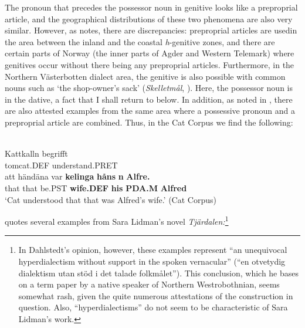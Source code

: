 The pronoun that precedes the possessor noun in genitive looks like a preproprial article, and the geographical distributions of these two phenomena are also very similar. However, as \citet[67]{Delsing2003b} notes, there are discrepancies: preproprial articles are used\textstyleLinguisticExample{ }in the area between the inland and the coastal \textit{h}{}-genitive zones, and there are certain parts of Norway (the inner parts of Agder and Western Telemark) where genitives occur without there being any preproprial articles. Furthermore, in the Northern Västerbotten dialect area, the genitive is also possible with common nouns such as  ‘the shop-owner’s sack’ (\textit{Skelletmål}, \citet[23]{Marklund1976}). Here, the possessor noun is in the dative, a fact that I shall return to below. In addition, as noted in \citet{HolmbergEtAl}, there are also attested examples from the same area where a possessive pronoun and a preproprial article are combined. Thus, in the Cat Corpus we find the following:

\ea\label{}
\\
\gll Kattkalln  begrifft\\
tomcat.DEF  understand.PRET\\
\gll att  händäna  var  \textbf{kelinga} \textbf{håns} \textbf{n} \textbf{Alfre.}\\
that  that  be.PST  \textbf{wife.DEF} \textbf{his} \textbf{PDA.M} \textbf{Alfred}\\
\glt  ‘Cat understood that that was Alfred’s wife.’ (Cat Corpus)
\z

\citet[51]{Dahlstedt1971} quotes several examples from Sara Lidman’s novel \textit{Tjärdalen}\textit{:}\footnote{ In Dahlstedt’s opinion, however, these examples represent “an unequivocal hyperdialectism without support in the spoken vernacular” (“en otvetydig dialektism utan stöd i det talade folkmålet”). This conclusion, which he bases on a term paper by a native speaker of Northern Westrobothnian, seems somewhat rash, given the quite numerous attestations of the construction in question. Also, “hyperdialectisms” do not seem to be characteristic of Sara Lidman’s work.\par }


